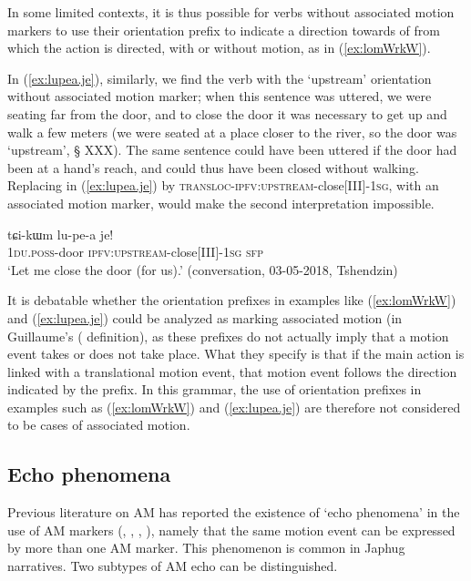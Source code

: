 In some limited contexts, it is thus possible for verbs without associated motion markers to use their orientation prefix to indicate a direction towards of from which the action is directed, with or without motion, as in (\ref{ex:lomWrkW}). 

In (\ref{ex:lupea.je}), similarly, we find the verb  with the `upstream' orientation without associated motion marker; when this sentence was uttered, we were seating far from the door, and to close the door it was necessary to get up and walk a few meters (we were seated at a place closer to the river, so the door was `upstream', § XXX). The same sentence could have been uttered if the door had been at a hand's reach, and could thus have been closed without walking. Replacing  in (\ref{ex:lupea.je}) by  \textsc{transloc}-\textsc{ipfv}:\textsc{upstream}-close[III]-\textsc{1sg}, with an associated motion marker, would make the second interpretation impossible.

\begin{exe}
\ex \label{ex:lupea.je}
\gll tɕi-kɯm lu-pe-a je! \\
\textsc{1du}.\textsc{poss}-door \textsc{ipfv}:\textsc{upstream}-close[III]-\textsc{1sg} \textsc{sfp} \\
\glt `Let me close the door (for us).' (conversation, 03-05-2018, Tshendzin)
\end{exe}

It is debatable whether the orientation prefixes in examples like (\ref{ex:lomWrkW}) and (\ref{ex:lupea.je}) could be analyzed as marking associated motion (in Guillaume's (\citeyear{guillaume16am} definition), as these prefixes do not actually imply that a motion event takes or does not take place. What they specify is that if the main action is linked with a translational motion event, that motion event follows the direction indicated by the prefix. In this grammar, the use of orientation prefixes in examples such as (\ref{ex:lomWrkW}) and (\ref{ex:lupea.je}) are therefore not considered to be cases of associated motion.

\subsection{Echo phenomena} \label{sec:AM.echo}
Previous literature on AM has reported the existence of `echo phenomena' in the use of AM markers (\citealt[251]{wilkins91associated.motion}, \citealt[681-683]{vuillermet12eseejja}, \citealt[128-130]{rose15am}, \citealt[11]{guillaume16am}), namely that the same motion event can be expressed by more than one AM marker. This phenomenon is common in Japhug narratives. Two subtypes of AM echo can be distinguished.

